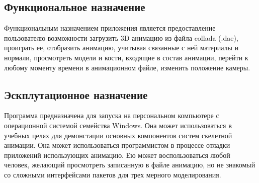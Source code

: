 \subsection{Функциональное назначение}
Функциональным назначением приложения является предоставление пользователю возможности загрузить 3D анимацию из файла collada (.dae), проиграть ее, отобразить анимацию, учитывая связанные с ней материалы и нормали, просмотреть модели и кости, входящие в состав анимации, перейти к любому моменту времени в анимационном файле, изменить положение камеры.

\subsection{Эскплутационное назначение}
Программа предназначена для запуска на персональном компьютере с операционной системой семейства Windows. Она может использоваться в учебных целях для демонстации основных компонентов систем скелетной анимации. Она может использоваться программистом в процессе отладки приложений использующих анимацию. Ею может воспользоваться любой человек, желающий просмотреть записанную в файле анимацию, но не знакомый со сложными интерфейсами пакетов для трех мерного моделирования.
